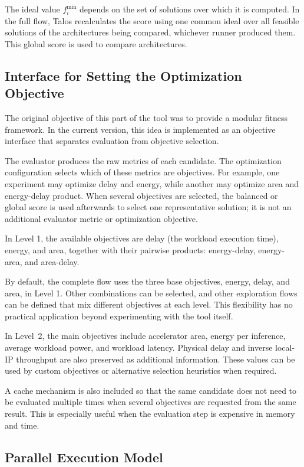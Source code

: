 The ideal value $f_i^{\min}$ depends on the set of solutions over
which it is computed. In the full flow, Talos recalculates the score
using one common ideal over all feasible solutions of the
architectures being compared, whichever runner produced them. This
global score is used to compare architectures.

\subsection{Interface for Setting the Optimization Objective}
The original objective of this part of the tool was to provide a
modular fitness framework. In the current version, this idea is
implemented as an objective interface that separates evaluation from
objective selection.

The evaluator produces the raw metrics of each candidate. The
optimization configuration selects which of these metrics are
objectives. For example, one experiment may optimize delay and
energy, while another may optimize area and energy-delay product.
When several objectives are selected, the balanced or global score is
used afterwards to select one representative solution; it is not an
additional evaluator metric or optimization objective.

In Level 1, the available objectives are delay (the workload
execution time), energy, and area, together with their pairwise
products: energy-delay, energy-area, and area-delay.

By default, the complete flow uses the three base objectives, energy,
delay, and area, in Level 1. Other combinations can be selected, and
other exploration flows can be defined that mix different objectives
at each level. This flexibility has no practical application beyond
experimenting with the tool itself.

In Level~2, the main objectives include accelerator area, energy per
inference, average workload power, and workload latency. Physical delay
and inverse local-IP throughput are also preserved as additional
information. These values can be used by custom objectives or
alternative selection heuristics when required.

A cache mechanism is also included so that the same candidate does
not need to be evaluated multiple times when several objectives are
requested from the same result. This is especially useful when the
evaluation step is expensive in memory and time.

\subsection{Parallel Execution Model}

